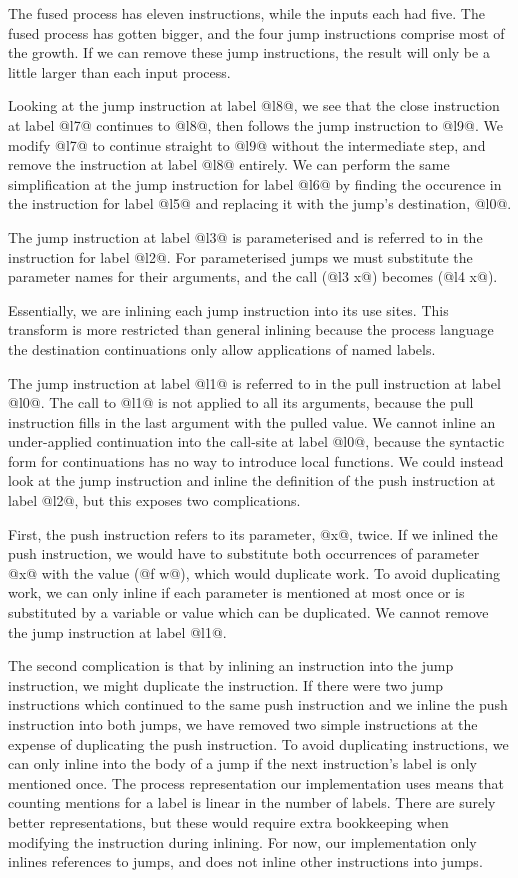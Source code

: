 The fused process has eleven instructions, while the inputs each had five.
The fused process has gotten bigger, and the four jump instructions comprise most of the growth.
If we can remove these jump instructions, the result will only be a little larger than each input process.

Looking at the jump instruction at label @l8@, we see that the close instruction at label @l7@ continues to @l8@, then follows the jump instruction to @l9@.
We modify @l7@ to continue straight to @l9@ without the intermediate step, and remove the instruction at label @l8@ entirely.
We can perform the same simplification at the jump instruction for label @l6@ by finding the occurence in the instruction for label @l5@ and replacing it with the jump's destination, @l0@.

The jump instruction at label @l3@ is parameterised and is referred to in the instruction for label @l2@.
For parameterised jumps we must substitute the parameter names for their arguments, and the call (@l3 x@) becomes (@l4 x@).

Essentially, we are inlining each jump instruction into its use sites.
This transform is more restricted than general inlining because the process language the destination continuations only allow applications of named labels.

The jump instruction at label @l1@ is referred to in the pull instruction at label @l0@.
The call to @l1@ is not applied to all its arguments, because the pull instruction fills in the last argument with the pulled value.
We cannot inline an under-applied continuation into the call-site at label @l0@, because the syntactic form for continuations has no way to introduce local functions.
We could instead look at the jump instruction and inline the definition of the push instruction at label @l2@, but this exposes two complications.

First, the push instruction refers to its parameter, @x@, twice.
If we inlined the push instruction, we would have to substitute both occurrences of parameter @x@ with the value (@f w@), which would duplicate work.
To avoid duplicating work, we can only inline if each parameter is mentioned at most once or is substituted by a variable or value which can be duplicated.
We cannot remove the jump instruction at label @l1@.

The second complication is that by inlining an instruction into the jump instruction, we might duplicate the instruction.
If there were two jump instructions which continued to the same push instruction and we inline the push instruction into both jumps, we have removed two simple instructions at the expense of duplicating the push instruction.
To avoid duplicating instructions, we can only inline into the body of a jump if the next instruction's label is only mentioned once.
The process representation our implementation uses means that counting mentions for a label is linear in the number of labels.
There are surely better representations, but these would require extra bookkeeping when modifying the instruction during inlining.
For now, our implementation only inlines references to jumps, and does not inline other instructions into jumps.

